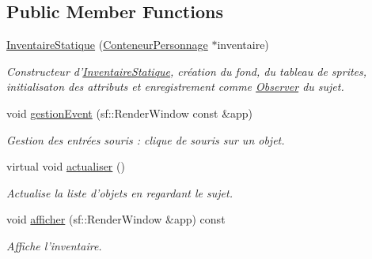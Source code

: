 \subsection*{Public Member Functions}
\begin{DoxyCompactItemize}
\item 
\hyperlink{classInventaireStatique_a5b4488dd115644006be4b7858ff6353e}{Inventaire\-Statique} (\hyperlink{classConteneurPersonnage}{Conteneur\-Personnage} $\ast$inventaire)
\begin{DoxyCompactList}\small\item\em Constructeur d'\hyperlink{classInventaireStatique}{Inventaire\-Statique}, création du fond, du tableau de sprites, initialisaton des attributs et enregistrement comme \hyperlink{classObserver}{Observer} du sujet. \end{DoxyCompactList}\item 
\hypertarget{classInventaireStatique_a6dfb8ac47f036ae0e9eb227fd9a581d7}{void \hyperlink{classInventaireStatique_a6dfb8ac47f036ae0e9eb227fd9a581d7}{gestion\-Event} (sf\-::\-Render\-Window const \&app)}\label{classInventaireStatique_a6dfb8ac47f036ae0e9eb227fd9a581d7}

\begin{DoxyCompactList}\small\item\em Gestion des entrées souris \-: clique de souris sur un objet. \end{DoxyCompactList}\item 
\hypertarget{classInventaireStatique_a1f818ef7b002b5ecbea11a08a1f411dd}{virtual void \hyperlink{classInventaireStatique_a1f818ef7b002b5ecbea11a08a1f411dd}{actualiser} ()}\label{classInventaireStatique_a1f818ef7b002b5ecbea11a08a1f411dd}

\begin{DoxyCompactList}\small\item\em Actualise la liste d'objets en regardant le sujet. \end{DoxyCompactList}\item 
void \hyperlink{classInventaireStatique_a6ecc65a6cd182cecffb56d247ca5fb84}{afficher} (sf\-::\-Render\-Window \&app) const 
\begin{DoxyCompactList}\small\item\em Affiche l'inventaire. \end{DoxyCompactList}\end{DoxyCompactItemize}
